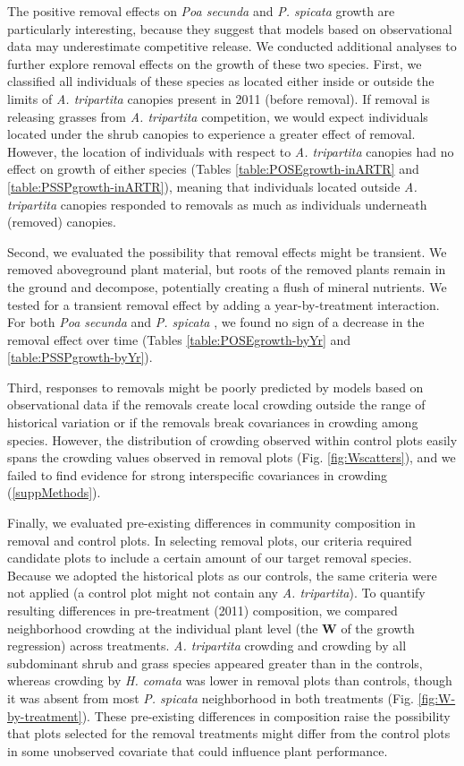\documentclass[11pt]{article}
\begin{document}
\begin{doublespacing}
The positive removal effects on \textit{Poa secunda}  and \textit{P. spicata} growth are particularly interesting, because they suggest that models based on observational data may underestimate competitive release. We conducted additional analyses to further explore removal effects on the growth of these two species. First, we classified all individuals of these species as located either inside or outside the limits of \textit{A. tripartita} canopies present in 2011 (before removal). If removal is releasing grasses from \textit{A. tripartita} competition, we would expect individuals located under the shrub canopies to experience a greater effect of removal. However, the location of individuals with respect to \textit{A. tripartita} canopies had no effect on growth of either species (Tables \ref{table:POSEgrowth-inARTR} and \ref{table:PSSPgrowth-inARTR}), meaning that individuals located outside \textit{A. tripartita} canopies responded to removals as much as individuals underneath (removed) canopies. 

Second, we evaluated the possibility that removal effects might be transient. We removed aboveground plant material, but roots of the removed plants remain in the ground and decompose, potentially creating a flush of mineral nutrients. We tested for a transient removal effect by adding a year-by-treatment interaction. For both  \textit{Poa secunda}  and \textit{P. spicata} , we found no sign of a decrease in the removal effect over time (Tables \ref{table:POSEgrowth-byYr} and \ref{table:PSSPgrowth-byYr}).

Third, responses to removals might be poorly predicted by models based on observational data if the removals create local crowding outside the range of historical variation or if the removals break covariances in crowding among species. However, the distribution of crowding observed within control plots easily spans the crowding values observed in removal plots (Fig. \ref{fig:Wscatters}), and we failed to find evidence for strong interspecific covariances in crowding (\ref{suppMethods}).

Finally, we evaluated pre-existing differences in community composition in removal and control plots. In selecting removal plots, our criteria required candidate plots to include a certain amount of our target removal species. Because we adopted the historical plots as our controls, the same criteria were not applied (a control plot might not contain any \textit{A. tripartita}). To quantify resulting differences in pre-treatment (2011) composition, we compared neighborhood crowding at the individual plant level (the $\boldsymbol{W}$ of the growth regression) across treatments. \textit{A. tripartita} crowding and crowding by all subdominant shrub and grass species appeared greater than in the controls, whereas crowding by \textit{H. comata} was lower in removal plots than controls, though it was absent from most \textit{P. spicata} neighborhood in both treatments (Fig. \ref{fig:W-by-treatment}). These pre-existing differences in composition raise the possibility that plots selected for the removal treatments might differ from the control plots in some unobserved covariate that could influence plant performance.


\end{doublespacing}
\end{document}
